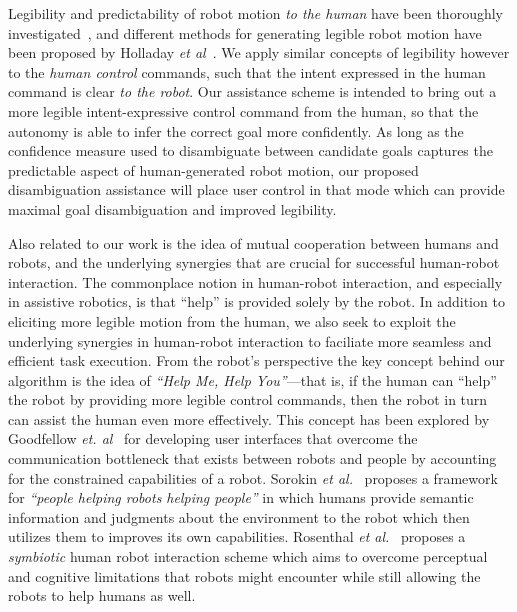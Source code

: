 \documentclass[conference]{IEEEtran}
\begin{document}
Legibility and predictability of robot motion \textit{to the human} have been thoroughly investigated~\cite{dragan2013legibility}, and different methods for generating legible robot motion have been proposed by Holladay \textit{et al}~\cite{holladay2014legible}. We apply similar concepts of legibility however to the \textit{human control} commands, such that the intent expressed in the human command is clear \textit{to the robot}. Our assistance scheme is intended to bring out a more legible intent-expressive control command from the human, so that the autonomy is able to infer the correct goal more confidently. 
As long as the confidence measure used to disambiguate between candidate goals captures the predictable aspect of human-generated robot motion, our proposed disambiguation assistance will place user control in that mode which can provide maximal goal disambiguation and improved legibility.

Also related to our work is the idea of mutual cooperation between humans and robots, and the underlying synergies that are crucial for successful human-robot interaction. The commonplace notion in human-robot interaction, and especially in assistive robotics, is that ``help'' is provided solely by the robot. In addition to eliciting more legible motion from the human, we also seek to exploit the underlying synergies in human-robot interaction to faciliate more seamless and efficient task execution. From the robot's perspective the key concept behind our algorithm is the idea of \textit{``Help Me, Help You''}---that is, if the human can ``help'' the robot by providing more legible control commands, then the robot in turn can assist the human even more effectively. This concept has been explored by Goodfellow \textit{et. al}~\cite{goodfellow2010help} for developing user interfaces that overcome the communication bottleneck that exists between robots and people by accounting for the constrained capabilities of a robot. Sorokin \textit{et al.}~\cite{sorokin2010people} proposes a framework for \textit{``people helping robots helping people''} in which humans provide semantic information and judgments about the environment to the robot which then utilizes them to improves its own capabilities.  Rosenthal \textit{et al.}~\cite{rosenthal2010effective} proposes a \textit{symbiotic} human robot interaction scheme which aims to overcome perceptual and cognitive limitations that robots might encounter while still allowing the robots to help humans as well. 
\end{document}
